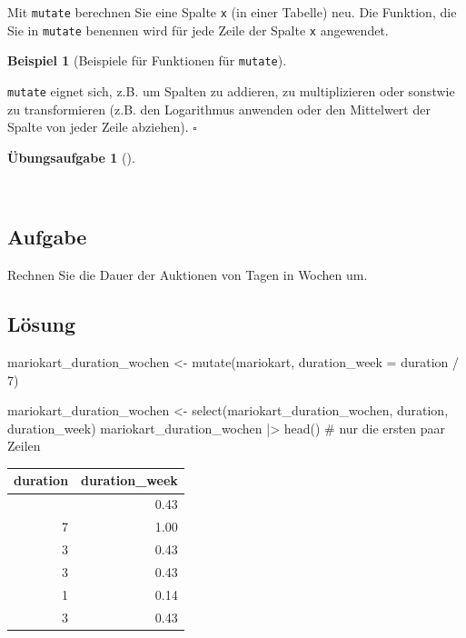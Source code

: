 \documentclass[
  a4paper,
  DIV=11]{scrreprt}
\newenvironment{Shaded}{\begin{snugshade}}{\end{snugshade}}
\newcommand{\AttributeTok}[1]{\textcolor[rgb]{0.40,0.45,0.13}{#1}}
\newcommand{\CommentTok}[1]{\textcolor[rgb]{0.37,0.37,0.37}{#1}}
\newcommand{\DecValTok}[1]{\textcolor[rgb]{0.68,0.00,0.00}{#1}}
\newcommand{\FunctionTok}[1]{\textcolor[rgb]{0.28,0.35,0.67}{#1}}
\newcommand{\NormalTok}[1]{\textcolor[rgb]{0.00,0.23,0.31}{#1}}
\newcommand{\OtherTok}[1]{\textcolor[rgb]{0.00,0.23,0.31}{#1}}
\newcommand{\SpecialCharTok}[1]{\textcolor[rgb]{0.37,0.37,0.37}{#1}}
\theoremstyle{definition}
\newtheorem{exercise}{Übungsaufgabe}[chapter]
\theoremstyle{definition}
\newtheorem{example}{Beispiel}[chapter]
\theoremstyle{definition}
\theoremstyle{remark}
\begin{document}
Mit \texttt{mutate} berechnen Sie eine Spalte \texttt{x} (in einer
Tabelle) neu. Die Funktion, die Sie in \texttt{mutate} benennen wird für
jede Zeile der Spalte \texttt{x} angewendet.

\begin{example}[Beispiele für Funktionen für
\texttt{mutate}]\protect\hypertarget{exm-mutate2}{}\label{exm-mutate2}

\texttt{mutate} eignet sich, z.B. um Spalten zu addieren, zu
multiplizieren oder sonstwie zu transformieren (z.B. den Logarithmus
anwenden oder den Mittelwert der Spalte von jeder Zeile abziehen).
\(\square\)

\end{example}

\begin{exercise}[]\protect\hypertarget{exr-mutate}{}\label{exr-mutate}

~

\subsection{Aufgabe}

Rechnen Sie die Dauer der Auktionen von Tagen in Wochen um.

\subsection{Lösung}

\begin{Shaded}
\begin{Highlighting}[]
\NormalTok{mariokart\_duration\_wochen }\OtherTok{\textless{}{-}} 
  \FunctionTok{mutate}\NormalTok{(mariokart, }\AttributeTok{duration\_week =}\NormalTok{ duration }\SpecialCharTok{/} \DecValTok{7}\NormalTok{)}

\NormalTok{mariokart\_duration\_wochen }\OtherTok{\textless{}{-}}
   \FunctionTok{select}\NormalTok{(mariokart\_duration\_wochen, duration, duration\_week)}
\NormalTok{mariokart\_duration\_wochen }\SpecialCharTok{|\textgreater{}} \FunctionTok{head}\NormalTok{()  }\CommentTok{\# nur die ersten paar Zeilen}
\end{Highlighting}
\end{Shaded}

\begin{longtable}[]{@{}rr@{}}
\toprule\noalign{}
duration & duration\_week \\
\midrule\noalign{}
\endhead
\bottomrule\noalign{}
\endlastfoot
3 & 0.43 \\
7 & 1.00 \\
3 & 0.43 \\
3 & 0.43 \\
1 & 0.14 \\
3 & 0.43 \\
\end{longtable}

\end{exercise}
\end{document}
